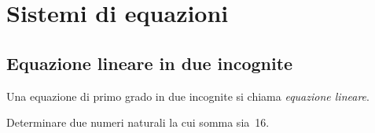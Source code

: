 
\chapter{Sistemi di equazioni}

\section{Equazione lineare in due incognite}
\label{sec:sist_eqdue}

\begin{definizione}
Una equazione di primo grado in due incognite si chiama \emph{equazione 
lineare}.
\end{definizione}

\begin{problema}
Determinare due numeri naturali la cui somma sia~16.
\end{problema}


